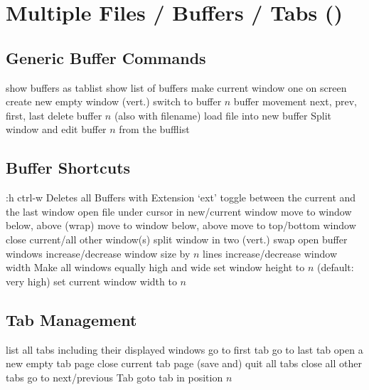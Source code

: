 \section{Multiple Files / Buffers / Tabs (\enter)}	{}
\subsection{Generic Buffer Commands}	{}
	{show buffers as tablist}
	{show list of buffers}
	{make current window one on screen}
	{create new empty window (vert.)}
	{switch to buffer $n$}
	{buffer movement next, prev, first, last}
	{delete buffer $n$ (also with filename)}
	{load file into new buffer}
	{Split window and edit buffer $n$ from the bufflist}

\subsection{Buffer Shortcuts}	{:h ctrl-w }
	{Deletes all Buffers with Extension `ext'}
\cmdS{\ctrl \^{} }	{toggle between the current and the last window}
	{open file under cursor in new/current window}
	{move to window below, above (wrap)}
	{move to window below, above}
	{move to top/bottom window}
	{close current/all other window(s)}
	{split window in two (vert.)}
	{swap open buffer windows }
	{increase/decrease window size by $n$ lines}
	{increase/decrease window width}
	{Make all windows equally high and wide}
	{set window height to $n$ (default: very high) }
	{set current window width to $n$ }

\subsection{Tab Management}	{}
	{list all tabs including their displayed windows}
	{go to first tab}
	{go to last tab}
	{open a new empty tab page}
	{close current tab page}
	{(save and) quit all tabs}
	{close all other tabs}
	{go to next/previous Tab}
	{goto tab in position $n$ }

